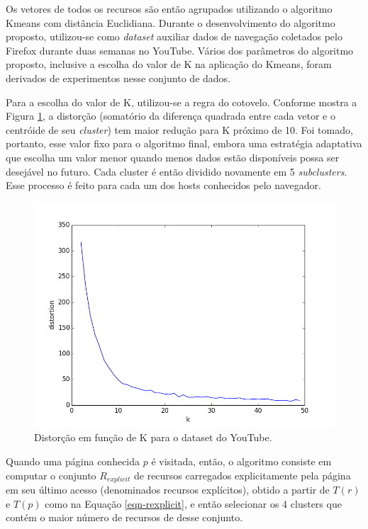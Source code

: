 \documentclass[10pt,twocolumn,letterpaper]{article}
\begin{document}
Os vetores de todos os recursos são então agrupados utilizando o algoritmo Kmeans com distância Euclidiana. Durante o desenvolvimento do algoritmo proposto, utilizou-se como \emph{dataset} auxiliar dados de navegação coletados pelo Firefox durante duas semanas no YouTube. Vários dos parâmetros do algoritmo proposto, inclusive a escolha do valor de K na aplicação do Kmeans, foram derivados de experimentos nesse conjunto de dados.

Para a escolha do valor de K, utilizou-se a regra do cotovelo. Conforme mostra a Figura \ref{fig-youtube-elbow}, a distorção (somatório da diferença quadrada entre cada vetor e o centróide de seu \emph{cluster}) tem maior redução para K próximo de 10. Foi tomado, portanto, esse valor fixo para o algoritmo final, embora uma estratégia adaptativa que escolha um valor menor quando menos dados estão disponíveis possa ser desejável no futuro. Cada cluster é então dividido novamente em 5 \emph{subclusters}. Esse processo é feito para cada um dos hosts conhecidos pelo navegador.

\begin{figure}
	\begin{center}
     \includegraphics[width=0.99\columnwidth]{pics/youtube_elbow.png}
    \caption{Distorção em função de K para o dataset do YouTube.}
    \label{fig-youtube-elbow}   
	\end{center} 
\end{figure}

Quando uma página conhecida $p$ é visitada, então, o algoritmo consiste em computar o conjunto $R_{explicit}$ de recursos carregados explicitamente pela página em seu último acesso (denominados recursos explícitos), obtido a partir de $T(r)$ e $T(p)$ como na Equação \ref{eqn-rexplicit}, e então selecionar os 4 clusters que contém o maior número de recursos de desse conjunto. 
\end{document}
